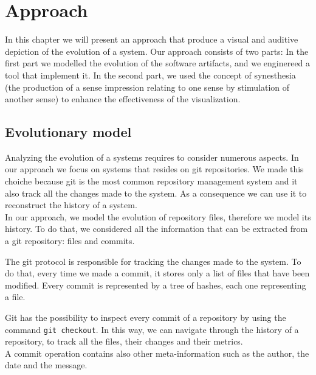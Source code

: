 
\chapter[Approach]{Approach}
\graphicspath{ {images/approach} }

In this chapter we will present an approach that produce a visual and auditive depiction of the evolution of a system. 
Our approach consists of two parts: 
In the first part we modelled the evolution of the software artifacts, and we enginereed a tool that implement it.
In the second part, we used the concept of synesthesia (the production of a sense impression relating to one sense by stimulation of another sense) 
to enhance the effectiveness of the visualization. 

\section{Evolutionary model}
Analyzing the evolution of a systems requires to consider numerous aspects. 
In our approach we focus on systems that resides on git repositories. 
We made this choiche because git is the most common repository management system and it also track all the changes made to the system.
As a consequence we can use it to reconstruct the history of a system.\\

In our approach, we model the evolution of repository files, therefore we model its history. 
To do that, we considered all the information that can be extracted from a git repository: files and commits.

The git protocol is responsible for tracking the changes made to the system.
To do that, every time we made a commit, it stores only a list of files that have been modified. 
Every commit is represented by a tree of hashes, each one representing a file. 

Git has the possibility to inspect every commit of a repository by using the command \texttt{git checkout}. 
In this way, we can navigate through the history of a repository, to track all the files, their changes and their metrics.\\

A commit operation contains also other meta-information such as the author, the date and the message. 

